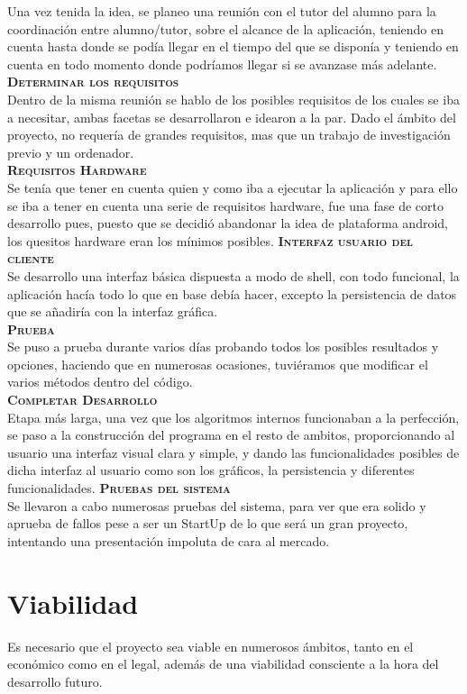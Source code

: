 Una vez tenida la idea, se planeo una reunión con el tutor del alumno para la coordinación entre alumno/tutor, sobre el alcance de la aplicación, teniendo en cuenta hasta donde se podía llegar en el tiempo del que se disponía y teniendo en cuenta en todo momento donde podríamos llegar si se avanzase más adelante.\\
\textbf{\textsc{Determinar los requisitos}}\\
Dentro de la misma reunión se hablo de los posibles requisitos de los cuales se iba a necesitar, ambas facetas se desarrollaron e idearon a la par. Dado el ámbito del proyecto, no requería de grandes requisitos, mas que un trabajo de investigación previo y un ordenador.\\
\textbf{\textsc{Requisitos Hardware}}\\
Se tenía que tener en cuenta quien y como iba a ejecutar la aplicación y para ello se iba a tener en cuenta una serie de requisitos hardware, fue una fase de corto desarrollo pues, puesto que se decidió abandonar la idea de plataforma android, los quesitos hardware eran los mínimos posibles.
\textbf{\textsc{Interfaz usuario del cliente}}\\
Se desarrollo una interfaz básica dispuesta a modo de shell, con todo funcional, la aplicación hacía todo lo que en base debía hacer, excepto la persistencia de datos que se añadiría con la interfaz gráfica.\\
\textbf{\textsc{Prueba}}\\
Se puso a prueba durante varios días probando todos los posibles resultados y opciones, haciendo que en numerosas ocasiones, tuviéramos que modificar el varios métodos dentro del código.\\
\textbf{\textsc{Completar Desarrollo}}\\
Etapa más larga, una vez que los algoritmos internos funcionaban a la perfección, se paso a la construcción del programa en el resto de ambitos, proporcionando al usuario una interfaz visual clara y simple, y dando las funcionalidades posibles de dicha interfaz al usuario como son los gráficos, la persistencia y diferentes funcionalidades.
\textbf{\textsc{Pruebas del sistema }}\\
Se llevaron a cabo numerosas pruebas del sistema, para ver que era solido y aprueba de fallos pese a ser un StartUp de lo que será un gran proyecto, intentando una presentación impoluta de cara al mercado.
\section{Viabilidad}
Es necesario que el proyecto sea viable en numerosos ámbitos, tanto en el económico como en el legal, además de una viabilidad consciente a la hora del desarrollo futuro.
